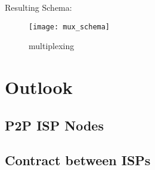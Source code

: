 Resulting Schema:

\begin{figure}
    \centering
    \texttt{[image: mux\_schema]}
    \caption{multiplexing}
    \label{fig:mux}
\end{figure}

\section{Outlook}
\subsection{P2P ISP Nodes}
\subsection{Contract between ISPs}